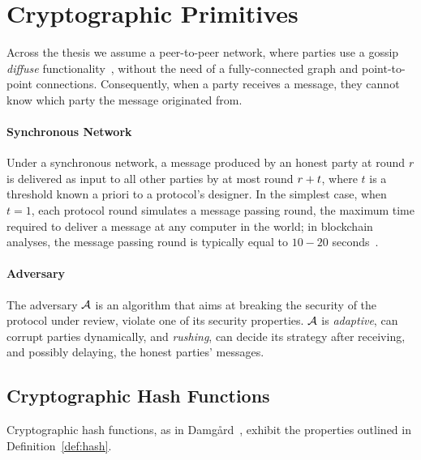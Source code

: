 \section{Cryptographic Primitives}

Across the thesis we assume a peer-to-peer network, where parties use a gossip
\emph{diffuse} functionality~\cite{EC:GarKiaLeo15}, without the need of a
fully-connected graph and point-to-point connections. Consequently, when a
party receives a message, they cannot know which party the message originated
from.

\paragraph{Synchronous Network}
Under a synchronous network, a message produced by an honest party at round
$r$ is delivered as input to all other parties by at most round $r +
t$, where $t$ is a threshold known a priori to a protocol's designer. In the
simplest case, when $t = 1$, each protocol round simulates a message passing
round, \ie the maximum time required to deliver a message at any computer in
the world; in blockchain analyses, the message passing round is typically equal
to $10-20$ seconds~\cite{EC:GarKiaLeo15,wood2014ethereum}.

\paragraph{Adversary}
The adversary $\mathcal{A}$ is an algorithm that aims at breaking the security
of the protocol under review, \ie violate one of its security properties.
$\mathcal{A}$ is \emph{adaptive}, \ie can corrupt parties dynamically, and
\emph{rushing}, \ie can decide its strategy after receiving, and possibly
delaying, the honest parties' messages.

\subsection{Cryptographic Hash Functions}

Cryptographic hash functions, as in Damg{\aa}rd~\cite{EC:Damgaard87},
exhibit the properties outlined in Definition~\ref{def:hash}.

